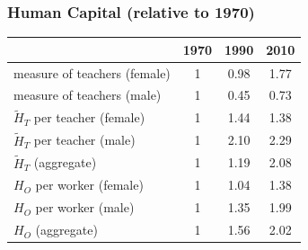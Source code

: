 \documentclass[11pt,hyperref={bookmarks=false},table,aspectratio=169]{beamer}
\begin{document}


\begin{frame}
\frametitle{Human Capital (relative to 1970)}

\begin{table}
  \centering \begin{tabular}{lccc}
\toprule
& 1970 & 1990 & 2010 \\
\midrule
measure of teachers (female) & 1 & 0.98 & 1.77\\
measure of teachers (male) & 1 & 0.45 & 0.73\\
$\widetilde{H}_T$ per teacher (female)   & 1 & 1.44 & 1.38 \\
$\widetilde{H}_T$ per teacher (male)   & 1 & 2.10 & 2.29 \\
$\widetilde{H}_T$ (aggregate) & 1  & 1.19 & 2.08 \\
$H_O$ per worker (female) & 1 & 1.04 & 1.38 \\
$H_O$ per worker (male) & 1 & 1.35 & 1.99 \\
$H_O$ (aggregate) & 1 & 1.56 & 2.02\\
\bottomrule
\end{tabular}
  \label{ }
\end{table}
%


\end{frame}
\end{document}
